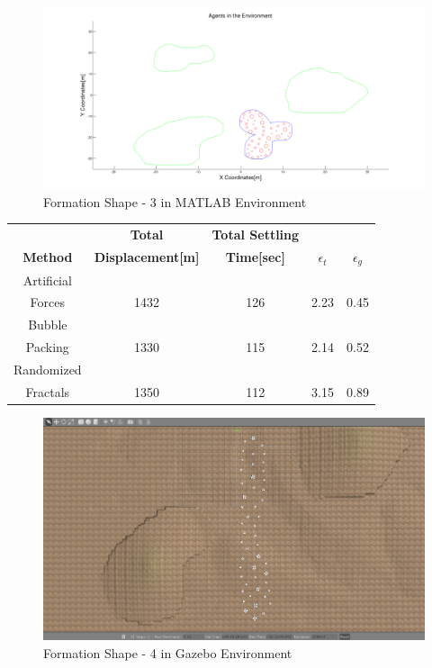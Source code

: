 \begin{figure}[H]
\caption{Formation Shape - 3 in MATLAB Environment}
\centerline{\includegraphics[scale = 0.32]{3}}
\end{figure} 			 

\newpage				
\begin{center}
 \label{perf_shape3} 
\begin{tabular}{|c|c|c|c|c|}
					
\hline
\textbf{} & \textbf{Total}  & \textbf{Total Settling} & \textbf{} & \textbf{} \\ \textbf{Method} & \textbf{Displacement[m]} & \textbf{Time[sec]}& \textbf{$\epsilon_t$} & \textbf{$\epsilon_g$} \\
\hline
Artificial&  &  &  & \\
 Forces & 1432 & 126& 2.23 & 0.45\\
 \hline
 Bubble&  &  &  & \\
 Packing &1330 &115 &2.14 & 0.52\\
\hline
 Randomized&  &  &  & \\
 Fractals &1350 &112 &3.15 & 0.89\\
\hline
\end{tabular}
\end{center}

				 
\begin{figure}[H]
\caption{Formation Shape - 4 in Gazebo Environment}
\centerline{\includegraphics[scale = 0.32]{4_Gazebo}}
\end{figure} 
			
